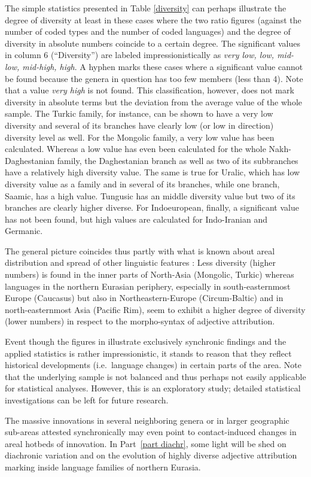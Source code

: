 The simple statistics presented in Table  \ref{diversity} can perhaps illustrate the degree of diversity at least in these cases where the two ratio figures (against the number of coded types and the number of coded languages) and the degree of diversity in absolute numbers coincide to a certain degree. The significant values in column 6 (“Diversity”) are labeled impressionistically as \textit{ very low, low, mid-low, mid-high, high}. A hyphen marks these cases where a significant value cannot be found because the genera in question has too few members (less than 4). Note that a value \textit{very high} is not found. This classification, however, does not mark diversity in absolute terms but the deviation from the average value of the whole sample. The Turkic family, for instance,  can be shown to have a very low diversity and several of its branches have clearly low (or low in direction) diversity level as well. For the Mongolic family, a very low value has been calculated. Whereas a low value has even been calculated for the whole Nakh-Daghestanian family, the Daghestanian branch as well as two of its subbranches have a relatively high diversity value. The same is true for Uralic, which has low diversity value as a family and in several of its branches, while one branch, Saamic, has a high value. Tungusic has an middle diversity value but two of its branches are clearly higher diverse. For Indoeuropean, finally, a significant value has not been found, but high values are calculated for Indo-Iranian and Germanic.

The general picture coincides thus partly with what is known about areal distribution and spread of other linguistic features \citep[cf., e.g.,][]{nichols1992}: Less diversity (higher numbers) is found in the inner parts of North-Asia (Mongolic, Turkic) whereas languages in the northern Eurasian periphery, especially in south-easternmost Europe (Caucasus) but also in Northeastern-Europe (Circum-Baltic) and in north-easternmost Asia (Pacific Rim), seem to exhibit a higher degree of diversity (lower numbers) in respect to the morpho-syntax of adjective attribution.

Event though the figures in  illustrate exclusively synchronic findings and the applied statistics is rather impressionistic, it stands to reason that they reflect historical developments (i.e.~language changes) in certain parts of the area. Note that the underlying sample is not balanced and thus perhaps not easily applicable for statistical analyses. However, this is an exploratory study; detailed statistical investigations can be left for future research.

The massive innovations in several neighboring genera or in larger geographic sub-areas attested synchronically may even point to contact-induced changes in areal hotbeds of innovation. In Part~\ref{part diachr}, some light will be shed on diachronic variation and on the evolution of highly diverse adjective attribution marking inside language families of northern Eurasia.
